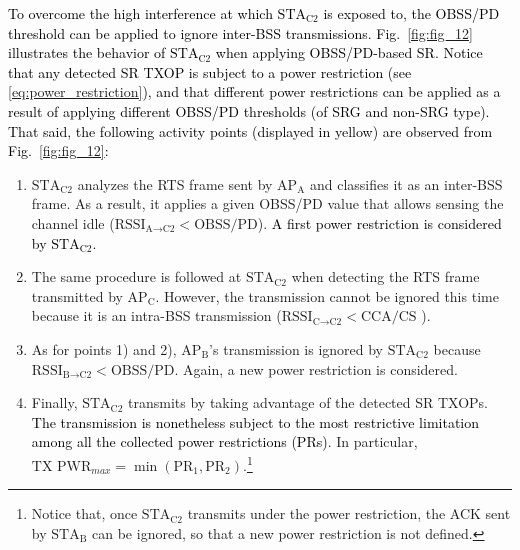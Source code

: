\documentclass{ieeeaccess}
\begin{document}
\textcolor{black}{To overcome the high interference at which $\text{STA}_\text{C2}$ is exposed to, the OBSS/PD threshold can be applied to ignore inter-BSS transmissions. Fig.~\ref{fig:fig_12} illustrates the behavior of $\text{STA}_\text{C2}$ when applying OBSS/PD-based SR. Notice that any detected SR TXOP is subject to a power restriction (see \eqref{eq:power_restriction}), and that different power restrictions can be applied as a result of applying different OBSS/PD thresholds (of SRG and non-SRG type). That said, the following activity points (displayed in yellow) are observed from Fig.~\ref{fig:fig_12}:}
\begin{enumerate}
	\item $\text{STA}_\text{C2}$ analyzes the RTS frame sent by $\text{AP}_\text{A}$ and classifies it as an inter-BSS frame. As a result, it applies a given OBSS/PD value that allows sensing the channel idle ($\text{RSSI}_{\text{A} \rightarrow \text{C2}} < \text{OBSS/PD}$). \textcolor{black}{A first power restriction is considered by $\text{STA}_\text{C2}$.}
	\item The same procedure is followed at $\text{STA}_\text{C2}$ when detecting the RTS frame transmitted by $\text{AP}_\text{C}$. However, the transmission cannot be ignored this time because it is an intra-BSS transmission ($\text{RSSI}_{\text{C} \rightarrow \text{C2}} < \text{CCA/CS}$ ).
	\item As for points 1) and 2), $\text{AP}_\text{B}$'s transmission is ignored by $\text{STA}_\text{C2}$ because $\text{RSSI}_{\text{B} \rightarrow \text{C2}} < \text{OBSS/PD}$. Again, a new power restriction is considered.
	\item Finally, $\text{STA}_\text{C2}$ transmits by taking advantage of the detected SR TXOPs. \textcolor{black}{The transmission is nonetheless subject to the most restrictive limitation among all the collected power restrictions (PRs)}. In particular, $\text{TX PWR}_{max} = \min(\text{PR}_1, \text{PR}_2)$.\footnote{Notice that, once $\text{STA}_\text{C2}$ transmits under the power restriction, the ACK sent by $\text{STA}_\text{B}$ can be ignored, so that a new power restriction is not defined.}
\end{enumerate}
\end{document}
